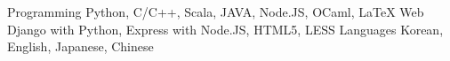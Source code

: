 \begin{cvskills}
  \cvskill
    {Programming}
    {Python, C/C++, Scala, JAVA, Node.JS, OCaml, LaTeX}
  \cvskill
    {Web}
    {Django with Python, Express with Node.JS, HTML5, LESS}
  \cvskill
    {Languages}
    {Korean, English, Japanese, Chinese}
\end{cvskills}